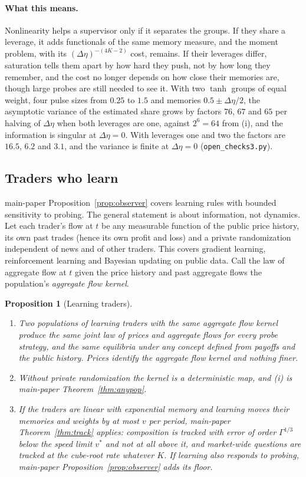\documentclass[12pt]{article}
\newtheorem{proposition}[theorem]{Proposition}
\theoremstyle{definition}
\theoremstyle{remark}
\begin{document}
\paragraph{What this means.} Nonlinearity helps a supervisor only if it separates the groups. If they share a leverage, it adds functionals of the same memory measure, and the moment problem, with its $(\Delta\eta)^{-(4K-2)}$ cost, remains. If their leverages differ, saturation tells them apart by how hard they push, not by how long they remember, and the cost no longer depends on how close their memories are, though large probes are still needed to see it. With two $\tanh$ groups of equal weight, four pulse sizes from $0.25$ to $1.5$ and memories $0.5\pm\Delta\eta/2$, the asymptotic variance of the estimated share grows by factors $76$, $67$ and $65$ per halving of $\Delta\eta$ when both leverages are one, against $2^6=64$ from (i), and the information is singular at $\Delta\eta=0$. With leverages one and two the factors are $16.5$, $6.2$ and $3.1$, and the variance is finite at $\Delta\eta=0$ (\nolinkurl{open_checks3.py}).

\subsection{Traders who learn}

main-paper Proposition~\ref{prop:observer} covers learning rules with bounded sensitivity to probing. The general statement is about information, not dynamics. Let each trader's flow at $t$ be any measurable function of the public price history, its own past trades (hence its own profit and loss) and a private randomization independent of news and of other traders. This covers gradient learning, reinforcement learning and Bayesian updating on public data. Call the law of aggregate flow at $t$ given the price history and past aggregate flows the population's \emph{aggregate flow kernel}.

\begin{proposition}[Learning traders]\label{prop:learners}
\begin{enumerate}[label=(\roman*),itemsep=1pt]
\item Two populations of learning traders with the same aggregate flow kernel produce the same joint law of prices and aggregate flows for every probe strategy, and the same equilibria under any concept defined from payoffs and the public history. Prices identify the aggregate flow kernel and nothing finer.
\item Without private randomization the kernel is a deterministic map, and (i) is main-paper Theorem~\ref{thm:anypop}.
\item If the traders are linear with exponential memory and learning moves their memories and weights by at most $v$ per period, main-paper Theorem~\ref{thm:track} applies: composition is tracked with error of order $\Gamma^{1/3}$ below the speed limit $v^*$ and not at all above it, and market-wide questions are tracked at the cube-root rate whatever $K$. If learning also responds to probing, main-paper Proposition~\ref{prop:observer} adds its floor.
\end{enumerate}
\end{proposition}
\end{document}
